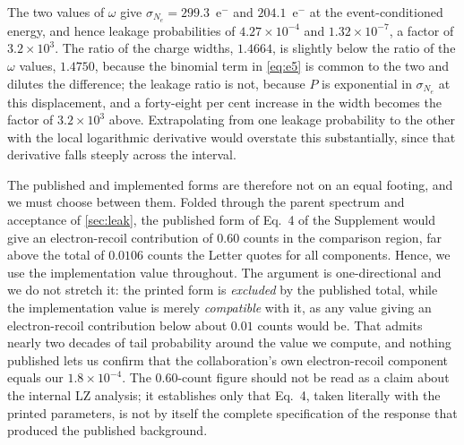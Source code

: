 \documentclass[11pt,a4paper]{article}
\begin{document}
The two values of \(\omega\) give \(\sigma_{N_e}=299.3\)~e\(^-\) and
\(204.1\)~e\(^-\) at the event-conditioned energy, and hence leakage
probabilities of \(4.27\times10^{-4}\) and \(1.32\times10^{-7}\), a
factor of \(3.2\times10^{3}\). The ratio of the charge widths,
\(1.4664\), is slightly below the ratio of the \(\omega\) values,
\(1.4750\), because the binomial term in \cref{eq:e5} is common to the
two and dilutes the difference; the leakage ratio is not,
because \(P\) is exponential in \(\sigma_{N_e}\) at this displacement,
and a forty-eight per cent increase in the width becomes the factor of
\(3.2\times10^{3}\) above. Extrapolating from one leakage probability to the
other with the local logarithmic derivative would overstate this
substantially, since that derivative falls steeply across the interval.

The published and implemented forms are therefore not on an equal
footing, and we must choose between them. Folded through the parent
spectrum and acceptance of \cref{sec:leak}, the published form of Eq.~4
of the Supplement would give an electron-recoil contribution of \(0.60\)
counts in the comparison region, far above the total of
\(0.0106\) counts the Letter quotes for all components. Hence, we use the
implementation value throughout. The argument is one-directional and we do
not stretch it: the printed form is \emph{excluded} by the published total,
while the implementation value is merely \emph{compatible} with it, as any
value giving an electron-recoil contribution below about \(0.01\) counts
would be. That admits nearly two decades of tail probability around the
value we compute, and nothing published lets us confirm that the
collaboration's own electron-recoil component equals our
\(1.8\times10^{-4}\). The \(0.60\)-count figure should not be
read as a claim about the internal LZ analysis; it establishes only that
Eq.~4, taken literally with the printed parameters, is not by itself the
complete specification of the response that produced the published
background. 
\end{document}
